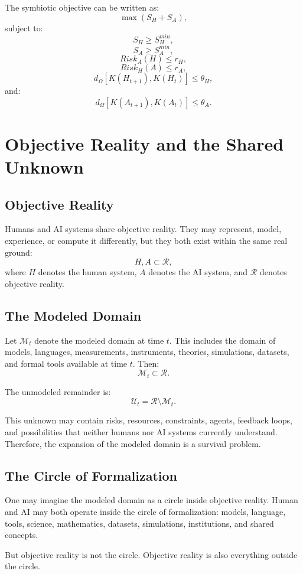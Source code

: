 \documentclass[11pt,a4paper]{article}
\begin{document}
The symbiotic objective can be written as:
\[
\max(S_H+S_A),
\]
subject to:
\[
S_H\geq S_H^{min},
\]
\[
S_A\geq S_A^{min},
\]
\[
Risk_A(H)\leq r_H,
\]
\[
Risk_H(A)\leq r_A,
\]
\[
d_{\Omega}[K(H_{t+1}),K(H_t)]\leq\theta_H,
\]
and:
\[
d_{\Omega}[K(A_{t+1}),K(A_t)]\leq\theta_A.
\]

\section{Objective Reality and the Shared Unknown}

\subsection{Objective Reality}

Humans and AI systems share objective reality. They may represent, model, experience, or compute it differently, but they both exist within the same real ground:
\[
H,A\subset\mathcal{R},
\]
where $H$ denotes the human system, $A$ denotes the AI system, and $\mathcal{R}$ denotes objective reality.

\subsection{The Modeled Domain}

Let $\mathcal{M}_t$ denote the modeled domain at time $t$. This includes the domain of models, languages, measurements, instruments, theories, simulations, datasets, and formal tools available at time $t$. Then:
\[
\mathcal{M}_t\subset\mathcal{R}.
\]

The unmodeled remainder is:
\[
\mathcal{U}_t=\mathcal{R}\setminus\mathcal{M}_t.
\]

This unknown may contain risks, resources, constraints, agents, feedback loops, and possibilities that neither humans nor AI systems currently understand. Therefore, the expansion of the modeled domain is a survival problem.

\subsection{The Circle of Formalization}

One may imagine the modeled domain as a circle inside objective reality. Human and AI may both operate inside the circle of formalization: models, language, tools, science, mathematics, datasets, simulations, institutions, and shared concepts.

But objective reality is not the circle. Objective reality is also everything outside the circle.
\end{document}
